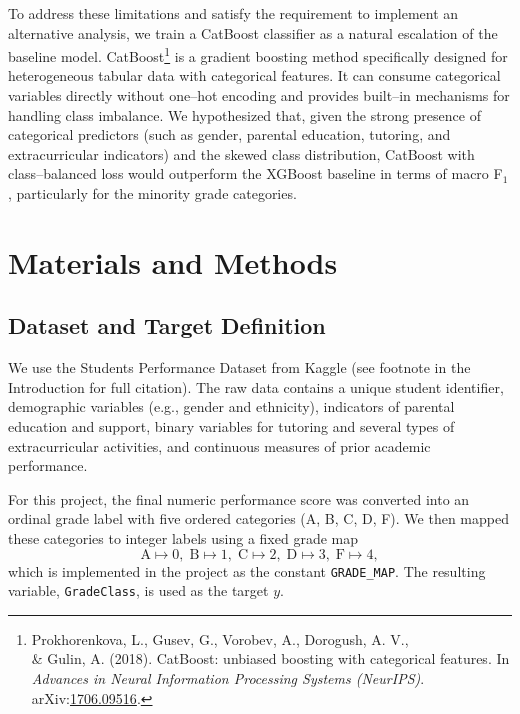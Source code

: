 \documentclass[11pt]{article}
\begin{document}
To address these limitations and satisfy the requirement to implement
an alternative analysis, we train a CatBoost classifier as a natural
escalation of the baseline model.  CatBoost\footnote{Prokhorenkova, L., Gusev, G., Vorobev, A., Dorogush, A. V., \\& Gulin, A. (2018). CatBoost: unbiased boosting with categorical features. In \emph{Advances in Neural Information Processing Systems (NeurIPS)}. arXiv:\href{https://arxiv.org/abs/1706.09516}{1706.09516}.} is a gradient boosting
method specifically designed for heterogeneous tabular data with
categorical features.  It can consume categorical variables directly
without one--hot encoding and provides built--in mechanisms for
handling class imbalance.  We hypothesized that, given the strong
presence of categorical predictors (such as gender, parental
education, tutoring, and extracurricular indicators) and the skewed
class distribution, CatBoost with class--balanced loss would
outperform the XGBoost baseline in terms of macro F$_1$, particularly
for the minority grade categories.

\section{Materials and Methods}

\subsection{Dataset and Target Definition}

We use the Students Performance Dataset from Kaggle (see footnote in the
Introduction for full citation).
The raw data contains a unique student identifier, demographic
variables (e.g., gender and ethnicity), indicators of parental
education and support, binary variables for tutoring and several types
of extracurricular activities, and continuous measures of prior
academic performance.

For this project, the final numeric performance score was converted
into an ordinal grade label with five ordered categories (A, B, C, D,
F).  We then mapped these categories to integer labels using a fixed
grade map
\begin{equation*}
		\text{A} \mapsto 0,\; \text{B} \mapsto 1,\; \text{C} \mapsto 2,\; \text{D} \mapsto 3,\; \text{F} \mapsto 4,
\end{equation*}
which is implemented in the project as the constant \texttt{GRADE\_MAP}.
The resulting variable, \texttt{GradeClass}, is used as the target $y$.
\end{document}
